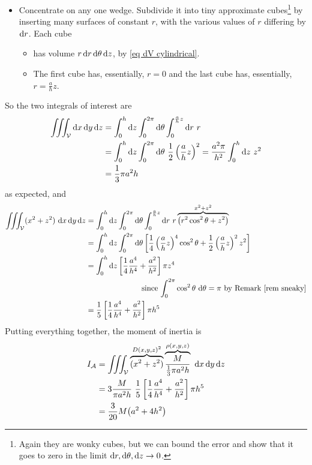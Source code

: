 \begin{eg}
\begin{itemize}
\item 
Concentrate on any one wedge. Subdivide it into tiny approximate 
cubes\footnote{Again they are wonky cubes, but we can bound the error
and show that it goes to zero in the limit $\mathrm{d}r,\mathrm{d}\theta,\mathrm{d}z
\rightarrow 0$. }
by inserting many surfaces of constant $r$, with the various values of $r$ differing by $\mathrm{d}r$.  Each cube 
\vspace{-\topsep}
\begin{itemize} \itemsep1pt \parskip0pt 
\item
has volume $r\,\mathrm{d}r\,\mathrm{d}\theta\,\mathrm{d}z$, by \eqref{eq dV cylindrical}.
\item 
The first cube has, essentially, $r=0$ and the last cube has,
essentially, $r=\frac{a}{h}z$. 
\end{itemize}
\vspace{-\topsep}
\end{itemize}
So the two integrals of interest are
\begin{align*}
\tripInt_\cV \dee{x}\,\dee{y}\,\dee{z}
&=\int_0^h\dee{z}\int_0^{2\pi}\dee{\theta}\int_0^{\frac{a}{h}z}\dee{r}\ r \\
&=\int_0^h\dee{z}\int_0^{2\pi}\dee{\theta}\ 
                   \frac{1}{2}\left(\frac{a}{h}z\right)^2
=\frac{a^2\pi}{h^2}\int_0^h\dee{z}\ z^2 \\
&=\frac{1}{3}\pi a^2 h
\end{align*}
as expected, and
\begin{align*}
\iiint_{\mathcal{V}} (x^2+z^2)\ \mathrm{d}x\,\mathrm{d}y\,\mathrm{d}z
&=\int_0^h\mathrm{d}z\int_0^{2\pi}\mathrm{d}\theta\int_0^{\frac{a}{h}z}\mathrm{d}r\ r
   \overbrace{\big(r^2\cos^2\theta+z^2\big)}^{x^2+z^2} \\
&=\int_0^h\mathrm{d}z\int_0^{2\pi}\mathrm{d}\theta\left[
      \frac{1}{4}\left(\frac{a}{h}z\right)^4\cos^2\theta
       +\frac{1}{2}\left(\frac{a}{h}z\right)^2z^2\right] \\
&=\int_0^h\mathrm{d}z\left[
      \frac{1}{4}\frac{a^4}{h^4}
       +\frac{a^2}{h^2}\right]\pi z^4\\
&\hskip1in\text{since $\int_0^{2\pi}\cos^2\theta\ \mathrm{d}\theta=\pi$
                 by Remark \ref{rem sneaky}} \\
&=\frac{1}{5}\left[
      \frac{1}{4}\frac{a^4}{h^4}
       +\frac{a^2}{h^2}\right]\pi h^5 
\end{align*}
Putting everything together, the moment of inertia is
\begin{align*}
I_{\mathcal{A}}
&=\iiint_{\mathcal{V}} \overbrace{(x^2+z^2)}^{D(x,y,z)^2}
              \overbrace{\frac{M}{\frac{1}{3}\pi a^2h}}^{\rho(x,y,z)}
             \ \mathrm{d}x\,\mathrm{d}y\,\mathrm{d}z \\
&=3\frac{M}{\pi a^2h} \ \frac{1}{5}\left[
      \frac{1}{4}\frac{a^4}{h^4}
       +\frac{a^2}{h^2}\right]\pi h^5 \\
&=\frac{3}{20} M\big(a^2+4h^2\big)
\end{align*}







\end{eg}

